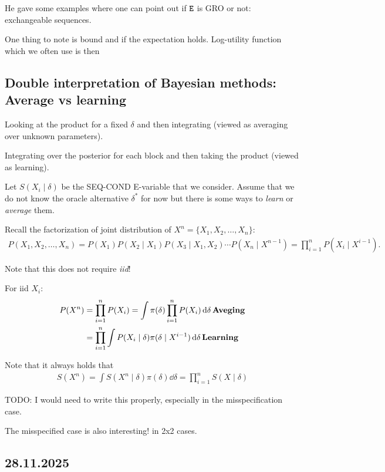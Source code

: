 He gave some examples where one can point out if $\texttt{E}$ is GRO or not: exchangeable sequences.

One thing to note is bound and if the expectation holds.
Log-utility function which we often use is then

\subsection*{Double interpretation of Bayesian methods: Average vs learning}

Looking at the product for a fixed $\delta$ and then integrating (viewed as averaging over unknown parameters).

Integrating over the posterior for each block and then taking the product (viewed as learning).

Let $S(X_i \mid \delta)$ be the SEQ-COND E-variable that we consider.
Assume that we do not know the oracle alternative $\delta^*$ for now but there is some ways to \emph{learn} or \emph{average} them.

Recall the factorization of joint distribution of $X^n=\{X_1,X_2,\dots,X_n\}$:
\begin{align*}
	P(X_1,X_2,\dots,X_n) = P(X_1) P(X_2\mid X_1) P(X_3\mid X_1,X_2) \cdots P(X_n\mid X^{n-1})
	= \prod_{i=1}^n P(X_i \mid X^{i-1}).
\end{align*}

Note that this does not require \emph{iid}!

For iid $X_i$:
\begin{align*}
	P(X^n) & = \prod_{i=1}^n P(X_i) = \int \pi(\delta) \prod_{i=1}^n P(X_i) \dd{\delta} \qq{Aveging}    \\
	       & = \prod_{i=1}^n \int P(X_i \mid \delta) \pi(\delta \mid X^{i-1}) \dd{\delta} \qq{Learning}
\end{align*}

Note that it always holds that
\begin{align*}
	S(X^n) = \int S(X^n\mid\delta)\pi(\delta) \dd{\delta} = \prod_{i=1}^n S(X\mid \delta)
\end{align*}


TODO: I would need to write this properly, especially in the misspecification case.

The misspecified case is also interesting! in 2x2 cases.

\subsection*{28.11.2025}

